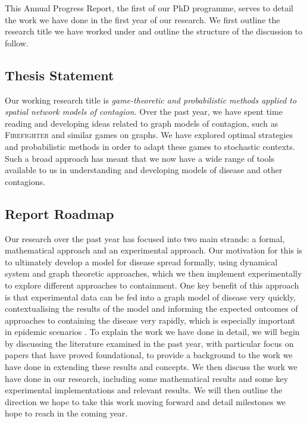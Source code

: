 \documentclass[../report.tex]{subfiles}
\begin{document}
This Annual Progress Report, the first of our PhD programme, serves to detail the work we have done in the first year of our research. We first outline the research title we have worked under and outline the structure of the discussion to follow.

\subsection{Thesis Statement}

Our working research title is {\it game-theoretic and probabilistic methods applied to spatial network models of contagion.} Over the past year, we have spent time reading and developing ideas related to graph models of contagion, such as {\scshape Firefighter} and similar games on graphs. We have explored optimal strategies and probabilistic methods in order to adapt these games to stochastic contexts. Such a broad approach has meant that we now have a wide range of tools available to us in understanding and developing models of disease and other contagions.

\subsection{Report Roadmap}

Our research over the past year has focused into two main strands: a formal, mathematical approach and an experimental approach. Our motivation for this is to ultimately develop a model for disease spread formally, using dynamical system and graph theoretic approaches, which we then implement experimentally to explore different approaches to containment. One key benefit of this approach is that experimental data can be fed into a graph model of disease very quickly, contextualising the results of the model and informing the expected outcomes of approaches to containing the disease very rapidly, which is especially important in epidemic scenarios \cite{firestone_2019}. To explain the work we have done in detail, we will begin by discussing the literature examined in the past year, with particular focus on papers that have proved foundational, to provide a background to the work we have done in extending these results and concepts. We then discuss the work we have done in our research, including some mathematical results and some key experimental implementations and relevant results. We will then outline the direction we hope to take this work moving forward and detail milestones we hope to reach in the coming year.
\end{document}
